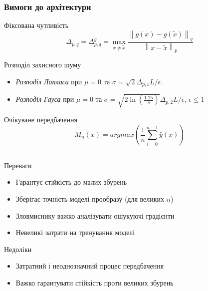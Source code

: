 \documentclass{beamer}
\numberwithin{equation}{section}
\begin{document}
	\begin{frame}
		\frametitle{Вимоги до архітектури}
		\begin{block}{Фіксована чутливість}
			 \begin{equation}
				\label{sensitivity}
				\Delta_{p, q}=\Delta_{p, q}^{g}=\max _{x \neq \tilde{x}} \frac{\left\|g(x)-g\left(\tilde{x}\right)\right\|_{q}}{\left\|x-\tilde{x}\right\|_{p}}
			\end{equation}
		\end{block}
	\vspace{0.3cm}
		\begin{block}{Розподіл захисного шуму}
			 \begin{itemize}
				\item \textit{Розподіл Лапласа} при $\mu = 0$ та $\sigma=\sqrt{2} \Delta_{p, 1} L / \epsilon$. 
				\item \textit{Розподіл Гауса} при $\mu = 0$ та $\sigma=\sqrt{2 \ln \left(\frac{1.25}{\delta}\right)} \Delta_{p, 2} L / \epsilon$, $\epsilon \leq 1$
			\end{itemize}
		\end{block}
	\vspace{0.3cm}
		\begin{block}{Очікуване передбачення}
			\begin{equation}
				M_n(x) = argmax\left(\frac{1}{n}\sum\limits_{i = 0}^{n-1}\hat{y}(x)\right)
			\end{equation}
		\end{block}
	    
	\end{frame}

	\subsection{}
	\begin{frame}
		\begin{block}{Переваги}
			\begin{itemize}
				\item Гарантує стійкість до малих збурень
				\item Зберігає точність моделі прообразу (для великих $n$)
				\item Зловмиснику важко аналізувати ошукуючі градієнти
				\item Невеликі затрати на тренування моделі
			\end{itemize}
		\end{block}
		
		\begin{block}{Недоліки}
			\begin{itemize}
				\item Затратний і неоднозначний процес передбачення
				\item Важко гарантувати стійкість проти великих збурень
			\end{itemize}
		\end{block}
	\end{frame}
\end{document}
